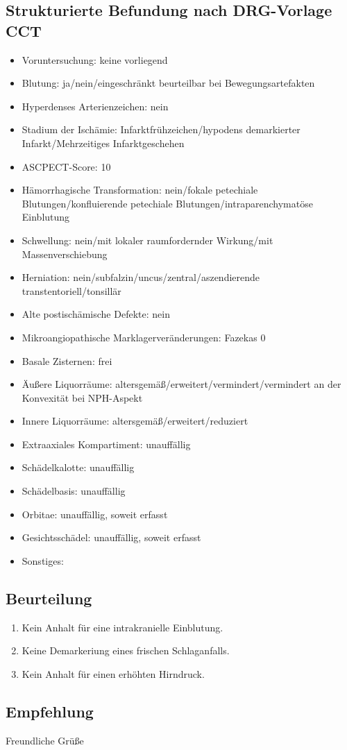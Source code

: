 \documentclass{scrartcl}
\begin{document}
\begin{letter}{\addressee{}}
  \subsection*{Strukturierte Befundung nach DRG-Vorlage CCT}
  \begin{itemize}
  \item Voruntersuchung: keine vorliegend
  \item Blutung: ja/nein/eingeschränkt beurteilbar bei Bewegungsartefakten
  \item Hyperdenses Arterienzeichen: nein
  \item Stadium der Ischämie: Infarktfrühzeichen/hypodens demarkierter Infarkt/Mehrzeitiges Infarktgeschehen
  \item ASCPECT-Score: 10
  \item Hämorrhagische Transformation: nein/fokale petechiale Blutungen/konfluierende petechiale Blutungen/intraparenchymatöse Einblutung
  \item Schwellung: nein/mit lokaler raumfordernder Wirkung/mit Massenverschiebung
  \item Herniation: nein/subfalzin/uncus/zentral/aszendierende transtentoriell/tonsillär
  \item Alte postischämische Defekte: nein
  \item Mikroangiopathische Marklagerveränderungen: Fazekas 0
  \item Basale Zisternen: frei
  \item Äußere Liquorräume: altersgemäß/erweitert/vermindert/vermindert an der Konvexität bei NPH-Aspekt
  \item Innere Liquorräume: altersgemäß/erweitert/reduziert
  \item Extraaxiales Kompartiment: unauffällig
  \item Schädelkalotte: unauffällig
  \item Schädelbasis: unauffällig
  \item Orbitae: unauffällig, soweit erfasst
  \item Gesichtsschädel: unauffällig, soweit erfasst
  \item Sonstiges: 
  \end{itemize}
  \subsection*{Beurteilung}
  \begin{enumerate}
  \item Kein Anhalt für eine intrakranielle Einblutung.
  \item Keine Demarkeriung eines frischen Schlaganfalls.
  \item Kein Anhalt für einen erhöhten Hirndruck.
  \end{enumerate}
  \subsection*{Empfehlung}

  \closing{Freundliche Grüße}

\end{letter}
\end{document}
